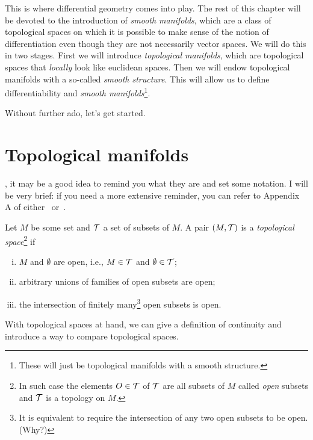 This is where differential geometry comes into play.
The rest of this chapter will be devoted to the introduction of \emph{smooth manifolds}, which are a class of topological spaces on which it is possible to make sense of the notion of differentiation even though they are not necessarily vector spaces.
We will do this in two stages.
First we will introduce \emph{topological manifolds}, which are topological spaces that \emph{locally} look like euclidean spaces.
Then we will endow topological manifolds with a so-called \emph{smooth structure}.
This will allow us to define differentiability and \emph{smooth manifolds}\footnote{These will just be topological manifolds with a smooth structure.}.

Without further ado, let's get started.

\section{Topological manifolds}

, it may be a good idea to remind you what they are and set some notation.
I will be very brief: if you need a more extensive reminder, you can refer to Appendix A of either~\cite{book:tu} or~\cite{book:lee}.

\begin{definition}
  Let $M$ be some set and $\mathcal{T}$ a set of subsets of $M$.
  A pair $(M, \mathcal{T})$ is a \emph{topological space}\footnote{In such case the elements $O\in\mathcal{T}$ of $\mathcal{T}$ are all subsets of $M$ called \emph{open} subsets and $\mathcal{T}$ is a topology on $M$.} if
  \begin{enumerate}[(i)]
    \item $M$ and $\emptyset$ are open, i.e., $M\in \mathcal{T}$ and $\emptyset\in\mathcal{T}$;
    \item arbitrary unions of families of open subsets are open;
    \item the intersection of finitely many\footnote{It is equivalent to require the intersection of any two open subsets to be open. (Why?)} open subsets is open.
  \end{enumerate}
\end{definition}

With topological spaces at hand, we can give a definition of continuity and introduce a way to compare topological spaces.


